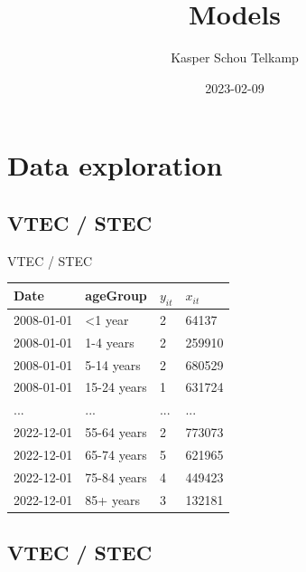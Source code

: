 \documentclass[aspectratio=169]{beamer}
\title[Automated and Early Detection of Disease Outbreaks]{Models}
\author{Kasper Schou Telkamp}
\institute{Section for Dynamical Systems}
\date{2023-02-09}
\begin{document}
\frame{
	\maketitle
}


\hypertarget{data-exploration}{%
\section{Data exploration}\label{data-exploration}}

\hypertarget{vtec-stec}{%
\subsection*{VTEC / STEC}\label{vtec-stec}}

\begin{frame}{VTEC / STEC}
\tiny

\begin{table}
\centering\begingroup\fontsize{12}{14}\selectfont

\begin{tabular}{llll}
\toprule
Date & ageGroup & $y_{it}$ & $x_{it}$\\
\midrule
2008-01-01 & <1 year & 2 & 64137\\
2008-01-01 & 1-4 years & 2 & 259910\\
2008-01-01 & 5-14 years & 2 & 680529\\
2008-01-01 & 15-24 years & 1 & 631724\\
... & ... & ... & ...\\
2022-12-01 & 55-64 years & 2 & 773073\\
2022-12-01 & 65-74 years & 5 & 621965\\
2022-12-01 & 75-84 years & 4 & 449423\\
2022-12-01 & 85+ years & 3 & 132181\\
\bottomrule
\end{tabular}
\endgroup{}
\end{table}

\normalsize
\end{frame}

\hypertarget{vtec-stec-1}{%
\subsection{VTEC / STEC}\label{vtec-stec-1}}
\end{document}

